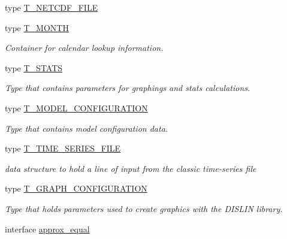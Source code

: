 \begin{DoxyCompactItemize}
type \hyperlink{typetest_1_1_t___n_e_t_c_d_f___f_i_l_e}{T\_\-NETCDF\_\-FILE}
\item 
type \hyperlink{typetest_1_1_t___m_o_n_t_h}{T\_\-MONTH}
\begin{DoxyCompactList}\small\item\em Container for calendar lookup information. \item\end{DoxyCompactList}\item 
type \hyperlink{typetest_1_1_t___s_t_a_t_s}{T\_\-STATS}
\begin{DoxyCompactList}\small\item\em Type that contains parameters for graphings and stats calculations. \item\end{DoxyCompactList}\item 
type \hyperlink{typetest_1_1_t___m_o_d_e_l___c_o_n_f_i_g_u_r_a_t_i_o_n}{T\_\-MODEL\_\-CONFIGURATION}
\begin{DoxyCompactList}\small\item\em Type that contains model configuration data. \item\end{DoxyCompactList}\item 
type \hyperlink{typetest_1_1_t___t_i_m_e___s_e_r_i_e_s___f_i_l_e}{T\_\-TIME\_\-SERIES\_\-FILE}
\begin{DoxyCompactList}\small\item\em data structure to hold a line of input from the classic time-\/series file \item\end{DoxyCompactList}\item 
type \hyperlink{typetest_1_1_t___g_r_a_p_h___c_o_n_f_i_g_u_r_a_t_i_o_n}{T\_\-GRAPH\_\-CONFIGURATION}
\begin{DoxyCompactList}\small\item\em Type that holds parameters used to create graphics with the DISLIN library. \item\end{DoxyCompactList}\item 
interface \hyperlink{interfacetest_1_1approx__equal}{approx\_\-equal}
\end{DoxyCompactItemize}
